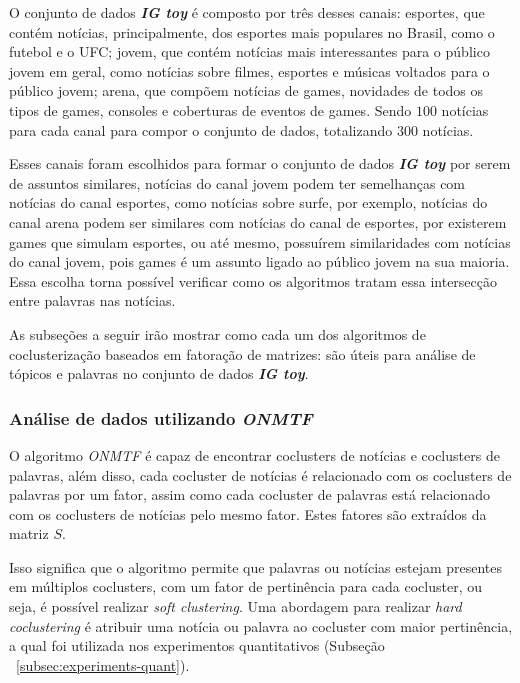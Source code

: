 \documentclass[
    12pt,                %
    oneside,            %
    a4paper,            %
    english,            %
    brazil                %
    ]{abntex2ppgsi}
\begin{document}
O conjunto de dados \textit{\textbf{IG toy}} é composto por três desses canais: esportes, que contém notícias, principalmente, dos esportes mais populares no Brasil, como o futebol e o UFC; jovem, que contém notícias mais interessantes para o público jovem em geral, como notícias sobre filmes, esportes e músicas voltados para o público jovem; arena, que compõem notícias de games, novidades de todos os tipos de games, consoles e coberturas de eventos de games.
Sendo $100$ notícias para cada canal para compor o conjunto de dados, totalizando $300$ notícias.

Esses canais foram escolhidos para formar o conjunto de dados \textit{\textbf{IG toy}} por serem de assuntos similares, notícias do canal jovem podem ter semelhanças com notícias do canal esportes, como notícias sobre surfe, por exemplo, notícias do canal arena podem ser similares com notícias do canal de esportes, por existerem games que simulam esportes, ou até mesmo, possuírem similaridades com notícias do canal jovem, pois games é um assunto ligado ao público jovem na sua maioria.
Essa escolha torna possível verificar como os algoritmos tratam essa intersecção entre palavras nas notícias.

As subseções a seguir irão mostrar como cada um dos algoritmos de coclusterização baseados em fatoração de matrizes:
são úteis para análise de tópicos e palavras no conjunto de dados \textit{\textbf{IG toy}}.

\subsubsection{Análise de dados utilizando \textit{ONMTF}}

O algoritmo \textit{ONMTF} é capaz de encontrar coclusters de notícias e coclusters de palavras, além disso, cada cocluster de notícias é relacionado com os coclusters de palavras por um fator, assim como cada cocluster de palavras está relacionado com os coclusters de notícias pelo mesmo fator.
Estes fatores são extraídos da matriz $S$.

Isso significa que o algoritmo permite que palavras ou notícias estejam presentes em múltiplos coclusters, com um fator de pertinência para cada cocluster, ou seja, é possível realizar \textit{soft clustering}.\tabularnewline
Uma abordagem para realizar \textit{hard coclustering} é atribuir uma notícia ou palavra ao cocluster com maior pertinência, a qual foi utilizada nos experimentos quantitativos (Subseção ~\ref{subsec:experiments-quant}).
\end{document}
